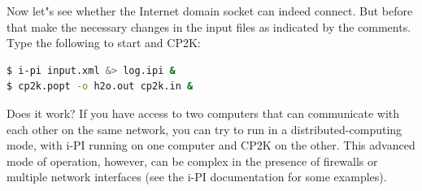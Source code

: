 \documentclass{article}
\begin{document}
\begin{Exercise}[label={inputs},title={Keywords, outputs, and units of \ipi{}}]
\Question
Now let"s see whether the Internet domain socket can indeed connect. But before that make the necessary changes in the input files as indicated by the comments. 
Type the following to start \ipi{} and CP2K:
\begin{lstlisting}[language=bash]
$ i-pi input.xml &> log.ipi &
$ cp2k.popt -o h2o.out cp2k.in &
\end{lstlisting}
Does it work? If you have access to two computers that can communicate with each
other on the same network, you can try to run in a distributed-computing mode,
with i-PI running on one computer and CP2K on the other. This advanced mode of 
operation, however, can be complex in the presence of firewalls or multiple 
network interfaces (see the i-PI documentation for some examples). 

\end{Exercise}
\end{document}

